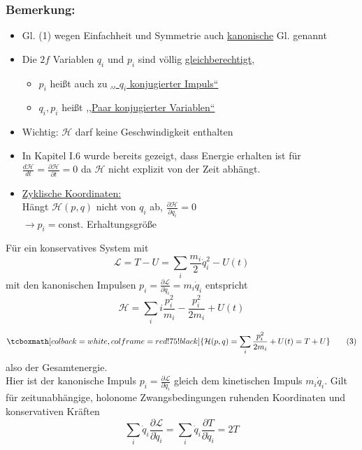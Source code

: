 \documentclass[titlepage,12pt,a4paper,ngerman]{report}
\newcommand{\tx}[1]{\textrm{#1}}
\newcommand{\lag}{\mathcal{L}}
\newcommand{\ham}{\mathcal{H}}
\newcommand{\const}{\tx{const.}}
\newcommand{\rmbox}[1]{\tcboxmath[colback=white,colframe=red!75!black]{#1}} %
\begin{document}
\subsubsection{Bemerkung:}
\begin{itemize}
	\item Gl. (1) wegen Einfachheit und Symmetrie auch \underline{kanonische} Gl. genannt
	\item  Die $2 f$ Variablen $ q_i $ und $ p_i $ sind völlig \underline{gleichberechtigt},
	\begin{itemize}
		\item $ p_i $ heißt auch zu \underline{,, $ q_i $ konjugierter Impuls``}
		\item $ q_i , p_i $ heißt \underline{,,Paar konjugierter Variablen``}
	\end{itemize}
	\item Wichtig: $ \ham $ darf keine Geschwindigkeit enthalten
	\item In Kapitel I.6 wurde bereits gezeigt, dass Energie erhalten ist für $ \frac{d\ham}{dt} = \frac{\partial \ham}{\partial t} = 0 $ da $ \ham $ nicht explizit von der Zeit abhängt.
	\item \underline{Zyklische Koordinaten:}\\
	Hängt $ \ham(p,q) $ nicht von $ q_i $ ab, $\frac{\partial \ham}{\partial q_i} = 0$\\
	$ \rightarrow p_i = \const $ Erhaltungsgröße
\end{itemize}
Für ein konservatives System mit
\begin{equation*}
\lag = T - U = \sum_i \frac{m_i}{2} \dot{q}_i^2 - U(t)
\end{equation*}
mit den kanonischen Impulsen $ p_i = \frac{\partial \lag}{\partial \dot{q}_i} = m_i \dot{q}_i $ entspricht
\begin{equation*}
\ham = \sum_ii \frac{p_i^2}{m_i} - \frac{p_i^2}{2 m_i} + U(t)
\end{equation*}
\begin{equation*}
\rmbox{\ham(p,q) = \sum_i^{\phantom{i}} \frac{p_i^2}{2 m_i} + U(t) = T + U } \tag{3}
\end{equation*}
also der Gesamtenergie.\\
Hier ist der kanonische Impuls $ p_i = \frac{\partial \lag}{\partial \dot{q}_i} $ gleich dem kinetischen Impuls $ m_i \dot{q}_i $. Gilt für zeitunabhängige, holonome Zwangsbedingungen ruhenden Koordinaten und konservativen Kräften
\begin{equation*}
\sum_i \dot{q}_i \frac{\partial \lag}{\partial \dot{q}_i} = \sum_i \dot{q}_i \frac{\partial T}{\partial \dot{q}_i} = 2 T
\end{equation*}
\end{document}
